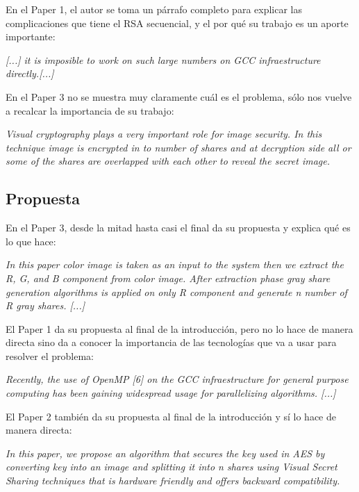 \documentclass[a4paper,12pt]{article}
\begin{document}
En el Paper 1, el autor se toma un párrafo completo para explicar las complicaciones que tiene el RSA secuencial, y el por qué
su trabajo es un aporte importante: \par

\textit{[...] it is imposible to work on such large numbers on GCC infraestructure directly.[...]} \par

En el Paper 3 no se muestra muy claramente cuál es el problema, sólo nos vuelve a recalcar la importancia de su trabajo: \par

\textit{Visual
cryptography plays a very important role for image security.
In this technique image is encrypted in to number of shares
and at decryption side all or some of the shares are overlapped
with each other to reveal the secret image.} \par

\subsection{Propuesta}

En el Paper 3, desde la mitad hasta casi el final da su propuesta y explica qué es lo que hace: \par

\textit{In this paper color image is
taken as an input to the system then we extract the R, G, and B
component from color image. After extraction phase gray
share generation algorithms is applied on only R component
and generate n number of R gray shares. [...]} \par

El Paper 1 da su propuesta al final de la introducción, pero no lo hace de manera directa sino da a conocer la importancia
de las tecnologías que va a usar para resolver el problema: \par

\textit{Recently, the use of OpenMP [6] on the GCC infraestructure for general purpose
computing has been gaining widespread usage for parallelizing algorithms. [...]}

El Paper 2 también da su propuesta al final de la introducción y sí lo hace de manera directa:

\textit{In this paper, we propose an algorithm that secures
the key used in AES by converting key into an image and
splitting it into n shares using Visual Secret Sharing
techniques that is hardware friendly and offers backward
compatibility.}
\end{document}
